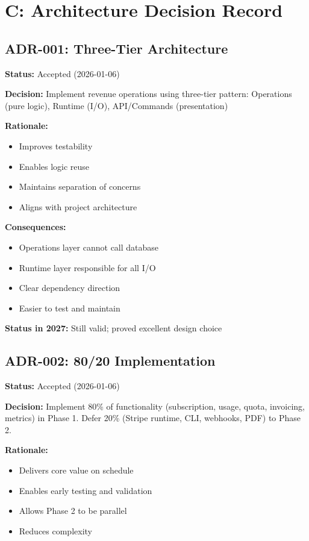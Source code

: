 \documentclass[12pt]{report}
\begin{document}
\chapter{C: Architecture Decision Record}

\section{ADR-001: Three-Tier Architecture}

\textbf{Status:} Accepted (2026-01-06)

\textbf{Decision:} Implement revenue operations using three-tier pattern: Operations (pure logic), Runtime (I/O), API/Commands (presentation)

\textbf{Rationale:}
\begin{itemize}
    \item Improves testability
    \item Enables logic reuse
    \item Maintains separation of concerns
    \item Aligns with project architecture
\end{itemize}

\textbf{Consequences:}
\begin{itemize}
    \item Operations layer cannot call database
    \item Runtime layer responsible for all I/O
    \item Clear dependency direction
    \item Easier to test and maintain
\end{itemize}

\textbf{Status in 2027:} Still valid; proved excellent design choice

\section{ADR-002: 80/20 Implementation}

\textbf{Status:} Accepted (2026-01-06)

\textbf{Decision:} Implement 80\% of functionality (subscription, usage, quota, invoicing, metrics) in Phase 1. Defer 20\% (Stripe runtime, CLI, webhooks, PDF) to Phase 2.

\textbf{Rationale:}
\begin{itemize}
    \item Delivers core value on schedule
    \item Enables early testing and validation
    \item Allows Phase 2 to be parallel
    \item Reduces complexity
\end{itemize}
\end{document}
